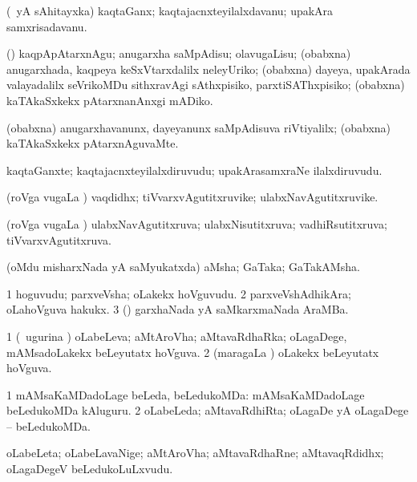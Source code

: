 \bentry
{}
\gl{\nA}
\bmng
(\aupa\ yA sAhitayxka) kaqtaGanx; kaqtajacnxteyilalxdavanu; upakAra samxrisadavanu. 
\emng
\eentry

\bentry
{}
\gl{\sakirx}
\bmng
(\AtAmx) kaqpApAtarxnAgu; anugarxha saMpAdisu; olavugaLisu; (obabxna) anugarxhada, kaqpeya keSxVtarxdalilx neleyUriko; (obabxna) dayeya, upakArada valayadalilx seVrikoMDu sithxravAgi sAthxpisiko, parxtiSAThxpisiko; (obabxna) kaTAkaSxkekx pAtarxnanAnxgi mADiko. 
\emng
\eentry

\bentry
{}
\gl{\nA}
\bmng
(obabxna) anugarxhavanunx, dayeyanunx saMpAdisuva riVtiyalilx; (obabxna) kaTAkaSxkekx pAtarxnAguvaMte. 
\emng
\eentry

\bentry
{}
\gl{\nA}
\bmng
kaqtaGanxte; kaqtajacnxteyilalxdiruvudu; upakArasamxraNe ilalxdiruvudu. 
\emng
\eentry

\bentry
{}
\gl{\nA}
\bmng
(roVga \mo vugaLa \vi) vaqdidhx; tiVvarxvAgutitxruvike; ulabxNavAgutitxruvike. 
\emng
\eentry

\bentry
{}
\gl{\gu}
\bmng
(roVga \mo vugaLa \vi) ulabxNavAgutitxruva; ulabxNisutitxruva; vadhiRsutitxruva; tiVvarxvAgutitxruva. 
\emng
\eentry

\bentry
{}
\gl{\nA}
\bmng
(oMdu misharxNada yA saMyukatxda) aMsha; GaTaka; GaTakAMsha. 
\emng
\eentry

\bentry
{}
\gl{\nA}
\bmng
\bnum
\num{1} hoguvudu; parxveVsha; oLakekx hoVguvudu. 
\num{2} parxveVshAdhikAra; oLahoVguva hakukx. 
\num{3} (\Kavi) garxhaNada yA saMkarxmaNada  AraMBa. 
\enum
\emng
\eentry

\bentry
{}
\gl{\nA}
\bmng
\bnum
\num{1} (\kanmu\ ugurina \vi) oLabeLeva; aMtAroVha; aMtavaRdhaRka; oLagaDege, mAMsadoLakekx beLeyutatx hoVguva. 
\num{2} (maragaLa \vi) oLakekx beLeyutatx hoVguva. 
\enum
\emng
\eentry

\bentry
{}
\gl{\gu}
\bmng
\bnum
\num{1} mAMsaKaMDadoLage beLeda, beLedukoMDa:  mAMsaKaMDadoLage beLedukoMDa kAluguru. 
\num{2} oLabeLeda; aMtavaRdhiRta; oLagaDe yA oLagaDege -- beLedukoMDa. 
\enum
\emng
\eentry

\bentry
{}
\gl{\nA}
\bmng
oLabeLeta; oLabeLavaNige; aMtAroVha; aMtavaRdhaRne; aMtavaqRdidhx; oLagaDegeV beLedukoLuLxvudu. 
\emng
\eentry

